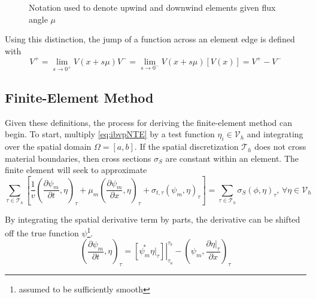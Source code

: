 \documentclass{article}
\newcommand{\mfesv}{\mathcal{V}_h}
\newcommand{\tauh}{\mathcal{T}_h}
\newcommand{\pdiff}[2]{\frac{\partial#1}{\partial#2}}
\newcommand{\ddx}[1]{\pdiff{#1}{x}}
\newcommand{\ddt}[1]{\pdiff{#1}{t}}
\newcommand{\dpmdx}{\ddx{\psi_m}}
\newcommand{\dpmdt}{\ddt{\psi_m}}
\newcommand{\forEtaInV}{,\,\forall\eta\in\mfesv}
\newcommand{\sumTaus}{\sum_{\tauinT}}
\newcommand{\tfem}{finite-element method }
\newcommand{\tauinT}{\tau\in\tauh}
\newcommand{\invv}{\frac{1}{v}}
\newcommand{\innerProd}[2]{\left(#1,#2\right)}
\newcommand{\tauInt}[2]{\innerProd{#1}{#2}_\tau}
\newcommand{\inTau}[1]{\left.#1\right\vert_{\tau}}
\newcommand{\jump}[1]{\left[#1\right]}
\begin{document}
\begin{figure}
    \centering
    \begin{tikzpicture}
        
    \end{tikzpicture}
    \caption{Notation used to denote upwind and downwind elements given flux angle $\mu$}
    \label{fig:upwDnw}
\end{figure}

Using this distinction, the jump of a function across an element edge is defined with
\begin{subequations}
    \begin{equation}
        V^+ = \lim_{s\rightarrow 0^+}V(x+s\mu)
    \end{equation}
    \begin{equation}
        V^- = \lim_{s\rightarrow 0^-}V(x+s\mu)
    \end{equation}
    \begin{equation}
        \label{eq:jumpDef}
        \jump{V(x)} = V^+-V^-
    \end{equation}
\end{subequations}

\subsection{Finite-Element Method}

Given these definitions, the process for deriving the \tfem can begin. 
To start, multiply \cref{eq:ibvpNTE} by a test function $\eta_i\in\mfesv$ and integrating over
the spatial domain $\Omega=[a,b]$.
If the spatial discretization $\mathcal{T}_h$ does not cross material boundaries, then cross sections $\sigma_S$
are constant within an element.
The finite element will seek to approximate
\begin{equation}
    \label{eq:derive0}
    \sumTaus\left[
        \invv\tauInt{\dpmdt}{\eta}
        +\mu_m\tauInt{\dpmdx}{\eta}
        +\sigma_{t,\tau}\tauInt{\psi_m}{\eta}
    \right]
    = \sumTaus\sigma_S\tauInt{\phi}{\eta}
    \forEtaInV
\end{equation}

By integrating the spatial derivative term by parts, the derivative can be shifted off
the true function $\psi$\footnote{assumed to be sufficiently smooth}.
\begin{equation}
    \tauInt{\dpmdt}{\eta} = \left.\left[\overset{*}{\psi_m}\inTau{\eta}\right]\right\vert_{\tau_a}^{\tau_b}
        -\tauInt{\psi_m}{\ddx{\inTau{\eta}}}
\end{equation}
\end{document}
